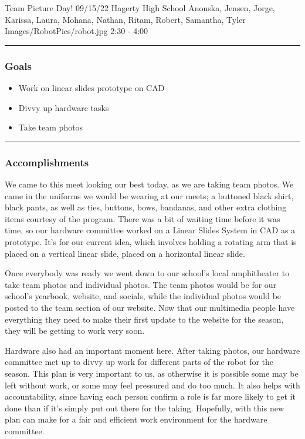 \insertmeeting 
	{Team Picture Day!} 
	{09/15/22}
	{Hagerty High School}
	{Anouska, Jensen, Jorge, Karissa, Laura, Mohana, Nathan, Ritam, Robert, Samantha, Tyler}
	{Images/RobotPics/robot.jpg}
	{2:30 - 4:00}
	
\noindent\hfil\rule{\textwidth}{.4pt}\hfil
\subsubsection*{Goals}
\begin{itemize}
    \item Work on linear slides prototype on CAD
    \item Divvy up hardware tasks
    \item Take team photos

\end{itemize} 

\noindent\hfil\rule{\textwidth}{.4pt}\hfil

\subsubsection*{Accomplishments}
We came to this meet looking our best today, as we are taking team photos. We came in the uniforms we would be wearing at our meets; a buttoned black shirt, black pants, as well as ties, buttons, bows, bandanas, and other extra clothing items courtesy of the program. There was a bit of waiting time before it was time, so our hardware committee worked on a Linear Slides System in CAD as a prototype. It’s for our current idea, which involves holding a rotating arm that is placed on a vertical linear slide, placed on a horizontal linear slide. 

Once everybody was ready we went down to our school's local amphitheater to take team photos and individual photos. The team photos would be for our school's yearbook, website, and socials, while the individual photos would be posted to the team section of our website. Now that our multimedia people have everything they need to make their first update to the website for the season, they will be getting to work very soon.

Hardware also had an important moment here. After taking photos, our hardware committee met up to divvy up work for different parts of the robot for the season. This plan is very important to us, as otherwise it is possible some may be left without work, or some may feel pressured and do too much. It also helps with accountability, since having each person confirm a role is far more likely to get it done than if it's simply put out there for the taking. Hopefully, with this new plan can make for a fair and efficient work environment for the hardware committee.


